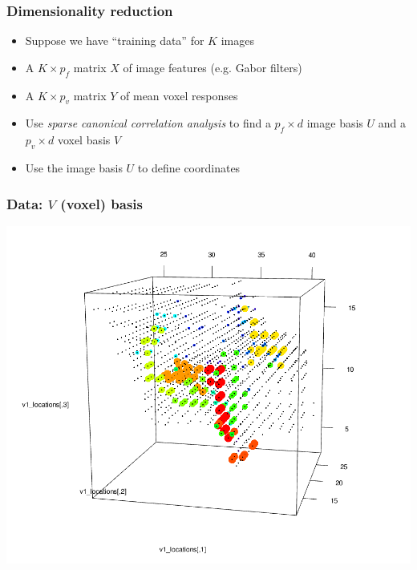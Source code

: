 \documentclass{beamer}
\begin{document}
\begin{frame}
\frametitle{Dimensionality reduction}
\begin{itemize}
\item Suppose we have ``training data'' for $K$ images
\item A $K \times p_f$ matrix $X$ of image features (e.g. Gabor filters)
\item A $K \times p_v$ matrix $Y$ of mean voxel responses
\item Use \emph{sparse canonical correlation analysis} to find a $p_f
  \times d$ image basis $U$ and a $p_v \times d$ voxel basis $V$
\item Use the image basis $U$ to define coordinates
\end{itemize}
\end{frame}

\begin{frame}
\frametitle{Data: $V$ (voxel) basis}
\begin{center}
\includegraphics[scale=0.3]{cca1.png}
\end{center}
\end{frame}
\end{document}
